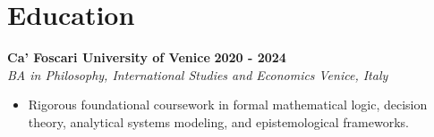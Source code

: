 \documentclass[10pt,a4paper]{article}
\newcommand{\role}[4]{%
  \textbf{#1} \hfill \textbf{#2}\\[1pt]%
  \textit{#3} \hfill \textit{#4}\\[2pt]%
}
\begin{document}
\section{Education}
\role{Ca' Foscari University of Venice}{2020 - 2024}{BA in Philosophy, International Studies and Economics}{Venice, Italy}
\begin{itemize}
  \item Rigorous foundational coursework in formal mathematical logic, decision theory, analytical systems modeling, and epistemological frameworks.
\end{itemize}
\end{document}

